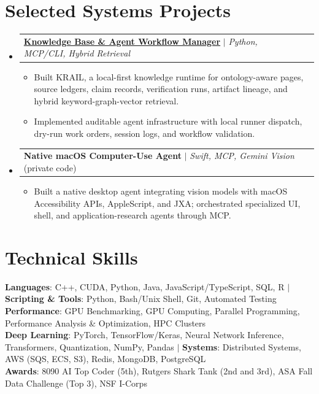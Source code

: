 \documentclass[letterpaper,11pt]{article}
\makeatletter
\newcommand{\resumeItem}[1]{
  \item\small{
    {#1 \vspace{-2pt}}
  }
}
\newcommand{\resumeProjectHeading}[2]{
    \item
    \begin{tabular*}{0.97\textwidth}{l@{\extracolsep{\fill}}r}
      \small#1 & #2 \\
    \end{tabular*}\vspace{-7pt}
}
\newcommand{\resumeSubHeadingListStart}{\begin{itemize}[leftmargin=0.15in, label={}]}
\newcommand{\resumeSubHeadingListEnd}{\end{itemize}}
\newcommand{\resumeItemListStart}{\begin{itemize}}
\newcommand{\resumeItemListEnd}{\end{itemize}\vspace{-5pt}}
\makeatother
\begin{document}
\section{Selected Systems Projects}
  \resumeSubHeadingListStart
    \resumeProjectHeading
      {\href{https://github.com/AkeBoss-tech/knowledge}{\textbf{Knowledge Base \& Agent Workflow Manager}} $|$ \emph{Python, MCP/CLI, Hybrid Retrieval}}{}
      \resumeItemListStart
        \resumeItem{Built KRAIL, a local-first knowledge runtime for ontology-aware pages, source ledgers, claim records, verification runs, artifact lineage, and hybrid keyword-graph-vector retrieval.}
        \resumeItem{Implemented auditable agent infrastructure with local runner dispatch, dry-run work orders, session logs, and workflow validation.}
      \resumeItemListEnd
    \resumeProjectHeading
      {\textbf{Native macOS Computer-Use Agent} $|$ \emph{Swift, MCP, Gemini Vision} (private code)}{}
      \resumeItemListStart
        \resumeItem{Built a native desktop agent integrating vision models with macOS Accessibility APIs, AppleScript, and JXA; orchestrated specialized UI, shell, and application-research agents through MCP.}
      \resumeItemListEnd
  \resumeSubHeadingListEnd
\section{Technical Skills}
 \begin{itemize}[leftmargin=0.15in, label={}]
    \small{\item{
     \textbf{Languages}{: C++, CUDA, Python, Java, JavaScript/TypeScript, SQL, R} $|$
     \textbf{Scripting \& Tools}{: Python, Bash/Unix Shell, Git, Automated Testing} \\
     \textbf{Performance}{: GPU Benchmarking, GPU Computing, Parallel Programming, Performance Analysis \& Optimization, HPC Clusters} \\
     \textbf{Deep Learning}{: PyTorch, TensorFlow/Keras, Neural Network Inference, Transformers, Quantization, NumPy, Pandas} $|$
     \textbf{Systems}{: Distributed Systems, AWS (SQS, ECS, S3), Redis, MongoDB, PostgreSQL} \\
     \textbf{Awards}{: 8090 AI Top Coder (5th), Rutgers Shark Tank (2nd and 3rd), ASA Fall Data Challenge (Top 3), NSF I-Corps}
    }}
 \end{itemize}
\end{document}
